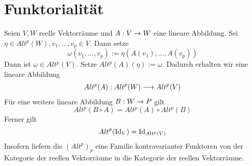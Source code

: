 \section{Funktorialität}
Seien $V,W$ reelle Vektorräume und $A : V\overset{}{\rightarrow} W$ eine lineare Abbildung. Sei $\eta \in Alt^p(W), v_1, \ldots, v_p \in V$. Dann setze
\[ \omega(v_1, \ldots, v_p) := \eta( A(v_1), \ldots, A(v_p) ) \]
Dann ist $\omega \in Alt^p(V)$. Setze $Alt^p(A)(\eta) := \omega$. Dadurch erhalten wir eine lineare Abbildung
\begin{align*}
Alt^p(A) : Alt^p(W) \overset{}{\longrightarrow} Alt^p(V)
\end{align*}
Für eine weitere lineare Abbildung $B : W \overset{}{\rightarrow} P$ gilt
\[ Alt^p(B\circ A) = Alt^p(A) \circ Alt^p(B) \]
Ferner gilt
\[ Alt^p(\text{Id}_{V}) = \text{Id}_{Alt^p(V)} \]
Insofern liefern die $(Alt^p)_p$ eine Familie kontravarianter Funktoren von der Kategorie der reellen Vektorräume in die Kategorie der reellen Vektorräume.